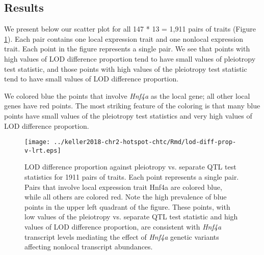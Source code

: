 \documentclass{book}
\begin{document}
\subsection{Results}


We present below our scatter plot for all 147 * 13 = 1,911 pairs of traits (Figure \ref{fig:lod-diff-prop-v-lrt-all}). Each pair contains one local expression trait and one nonlocal expression trait. Each point in the figure represents a single pair. We see that points with high values of LOD difference proportion tend to have small values of pleiotropy test statistic, and those points with high values of the pleiotropy test statistic tend to have small values of LOD difference proportion.

We colored blue the points that involve \emph{Hnf4a} as the local gene; all other local genes have red points. The most striking feature of the coloring is that many blue points have small values of the pleiotropy test statistics and very high values of LOD difference proportion.



\begin{figure}
    \centering
    \texttt{[image: ../keller2018-chr2-hotspot-chtc/Rmd/lod-diff-prop-v-lrt.eps]}
    \caption[LOD difference proportion vs. pleiotropy test statistic]{LOD difference proportion against pleiotropy vs. separate QTL test statistics for 1911 pairs of traits. Each point represents a single pair. Pairs that involve local expression trait Hnf4a are colored blue, while all others are colored red. Note the high prevalence of blue points in the upper left quadrant of the figure. These points, with low values of the pleiotropy vs. separate QTL test statistic and high values of LOD difference proportion, are consistent with \emph{Hnf4a} transcript levels mediating the effect of \emph{Hnf4a} genetic variants affecting nonlocal transcript abundances.}
    \label{fig:lod-diff-prop-v-lrt-all}
\end{figure}

\end{document}
